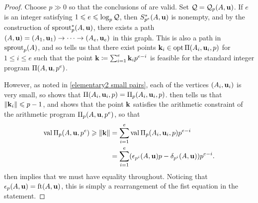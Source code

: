 \documentclass{amsart}
\begin{document}
\begin{proof}
   Choose $p \gg 0$ so that the conclusions of  are valid.
   Set $\mathcal{Q} = \mathcal{Q}_p(A,\mathbf{u})$.
   If $e$ is an integer satisfying $1 \leqslant e \leqslant \log_p\mathcal{Q}$, then $S_{p^e}^{\ast}(A,\mathbf{u})$ is nonempty, and by the construction of $\operatorname{sprout}_p^{\ast}(A,\mathbf{u})$, there exists a path $(A,\mathbf{u}) = (A_1, \mathbf{u}_1) \to \cdots \to (A_e, \mathbf{u}_e)$ in this graph.
   This is also a path in $\operatorname{sprout}_p(A)$, and so  tells us that there exist points $\mathbf{k}_i \in \operatorname{opt} \Pi(A_i, \mathbf{u}_i, p)$ for $1 \le i \le e$ such that the point $\mathbf{k} \coloneqq \sum_{i=1}^e \mathbf{k}_i p^{e-i}$ is feasible for the standard integer program $\Pi(A, \mathbf{u}, p^e)$.

   However, as noted in \eqref{elementary2 small pairs}, each of the vertices $(A_i, \mathbf{u}_i)$ is very small, so  shows that $\Pi(A_i,\mathbf{u}_i,p) = \Pi_p(A_i, \mathbf{u}_i, p)$.
    then tells us that $\| \mathbf{k}_i \| \leqslant p - 1$, and  shows that the point $\mathbf{k}$ satisfies the arithmetic constraint of the arithmetic program $\Pi_p(A,\mathbf{u},p^e)$, so that
   \begin{align*}
     \operatorname{val} \Pi_p(A,\mathbf{u},p^e) \geqslant  \| \mathbf{k} \| & = \sum_{i=1}^e \operatorname{val} \Pi_p(A_i,\mathbf{u}_i,p) p^{e-i} \\
                                                  & = \sum_{i=1}^e (\epsilon_{p^i}(A,\mathbf{u})p - \delta_{p^i}(A,\mathbf{u})) p^{e-i}.
   \end{align*}
    then implies that we must have equality throughout.
   Noticing that $\epsilon_p(A,\mathbf{u}) = \operatorname{ft}(A, \mathbf{u})$, this is simply a rearrangement of the fist equation in the statement.


\end{proof}
\end{document}
